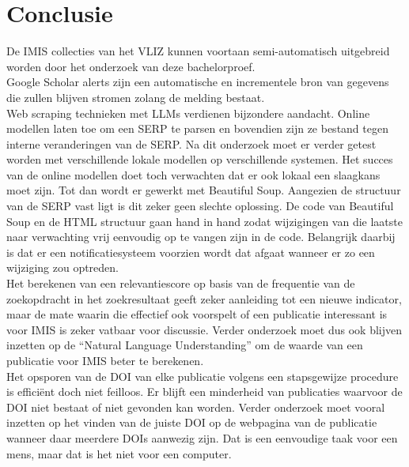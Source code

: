 
\chapter{Conclusie}%
\label{ch:conclusie}

De IMIS collecties van het VLIZ kunnen voortaan semi-automatisch uitgebreid worden door het onderzoek van deze bachelorproef.\\
Google Scholar alerts zijn een automatische en incrementele bron van gegevens die zullen blijven stromen zolang de melding bestaat.\\ 
Web scraping technieken met LLMs verdienen bijzondere aandacht. Online modellen laten toe om een SERP te parsen en bovendien zijn ze bestand tegen interne veranderingen van de SERP. Na dit onderzoek moet er verder getest worden met verschillende lokale modellen op verschillende systemen. Het succes van de online modellen doet toch verwachten dat er ook lokaal een slaagkans moet zijn. Tot dan wordt er gewerkt met Beautiful Soup. Aangezien de structuur van de SERP vast ligt is dit zeker geen slechte oplossing. De code van Beautiful Soup en de HTML structuur gaan hand in hand zodat wijzigingen van die laatste naar verwachting vrij eenvoudig op te vangen zijn in de code. Belangrijk daarbij is dat er een notificatiesysteem voorzien wordt dat afgaat wanneer er zo een wijziging zou optreden.\\
Het berekenen van een relevantiescore op basis van de frequentie van de zoekopdracht in het zoekresultaat geeft zeker aanleiding tot een nieuwe indicator, maar de mate waarin die effectief ook voorspelt of een publicatie interessant is voor IMIS is zeker vatbaar voor discussie. Verder onderzoek moet dus ook blijven inzetten op de ``Natural Language Understanding'' om de waarde van een publicatie voor IMIS beter te berekenen.\\
Het opsporen van de DOI van elke publicatie volgens een stapsgewijze procedure is efficiënt doch niet feilloos. Er blijft een minderheid van publicaties waarvoor de DOI niet bestaat of niet gevonden kan worden. Verder onderzoek moet vooral inzetten op het vinden van de juiste DOI op de webpagina van de publicatie wanneer daar meerdere DOIs aanwezig zijn. Dat is een eenvoudige taak voor een mens, maar dat is het niet voor een computer.\\
